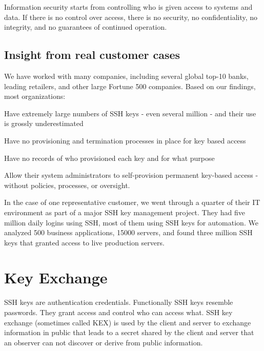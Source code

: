 \documentclass{article}
\begin{document}
Information security starts from controlling who is given access to systems and data. If there is no control over access, there is no security, no confidentiality, no integrity, and no guarantees of continued operation.


\subsection{Insight from real customer cases}
We have worked with many companies, including several global top-10 banks, leading retailers, and other large Fortune 500 companies. Based on our findings, most organizations:

Have extremely large numbers of SSH keys - even several million - and their use is grossly underestimated

Have no provisioning and termination processes in place for key based access

Have no records of who provisioned each key and for what purpose

Allow their system administrators to self-provision permanent key-based access - without policies, processes, or oversight.

In the case of one representative customer, we went through a quarter of their IT environment as part of a major SSH key management project. They had five million daily logins using SSH, most of them using SSH keys for automation. We analyzed 500 business applications, 15000 servers, and found three million SSH keys that granted access to live production servers.

\newpage

\section{Key Exchange}
SSH keys are authentication credentials. Functionally SSH keys resemble passwords. They grant access and control who can access what. 
SSH key exchange (sometimes called KEX) is used by the client and server to exchange information in public that leads to a secret shared by the client and server that an observer can not discover or derive from public information.
\end{document}
